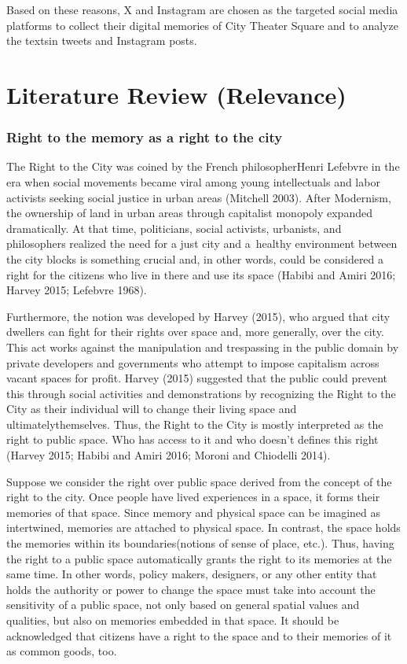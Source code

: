 \documentclass[
  letterpaper,
  DIV=11,
  numbers=noendperiod]{scrartcl}
\begin{document}
Based on these reasons, X and Instagram are chosen as the targeted
social media platforms to collect their digital memories of City Theater
Square and to analyze the textsin tweets and Instagram posts.

\newpage{}

\section{Literature Review
(Relevance)}\label{literature-review-relevance}

\subsubsection{Right to the memory as a right to the
city}\label{right-to-the-memory-as-a-right-to-the-city}

The Right to the City was coined by the French philosopherHenri Lefebvre
in the era when social movements became viral among young intellectuals
and labor activists seeking social justice in urban areas (Mitchell
2003). After Modernism, the ownership of land in urban areas through
capitalist monopoly expanded dramatically. At that time, politicians,
social activists, urbanists, and philosophers realized the need for a
just city and a~healthy environment between the city blocks is something
crucial and, in other words, could be considered a right for the
citizens who live in there and use its space (Habibi and Amiri 2016;
Harvey 2015; Lefebvre 1968).

Furthermore, the notion was developed by Harvey (2015), who argued that
city dwellers can fight for their rights over space and, more generally,
over the city. This act works against the manipulation and trespassing
in the public domain by private developers and governments who attempt
to impose capitalism across vacant spaces for profit. Harvey (2015)
suggested that the public could prevent this through social activities
and demonstrations by recognizing the Right to the City as their
individual will to change their living space and ultimatelythemselves.
Thus, the Right to the City is mostly interpreted as the right to public
space. Who has access to it and who doesn't defines this right (Harvey
2015; Habibi and Amiri 2016; Moroni and Chiodelli 2014).

Suppose we consider the right over public space derived from the concept
of the right to the city. Once people have lived experiences in a space,
it forms their memories of that space. Since memory and physical space
can be imagined as intertwined, memories are attached to physical space.
In contrast, the space holds the memories within its boundaries(notions
of sense of place, etc.). Thus, having the right to a public space
automatically grants the right to its memories at the same time. In
other words, policy makers, designers, or any other entity that holds
the authority or power to change the space must take into account the
sensitivity of a public space, not only based on general spatial values
and qualities, but also on memories embedded in that space. It should be
acknowledged that citizens have a right to the space and to their
memories of it as common goods, too.
\end{document}

